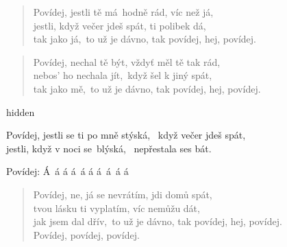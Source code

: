 \begin{song}{}
\begin{verse}
   Povídej, jestli tě má~hodně rád, víc než já, \\
   jestli, když večer jdeš spát, ti polibek dá, \\
   tak jako já,~to už je dávno, tak povídej, hej, povídej.
\end{verse}
\begin{verse}
   Povídej, nechal tě být, vždyť měl tě tak rád, \\
   nebos' ho nechala jít,~když šel k jiný spát, \\
   tak jako mě,~to už je dávno, tak povídej, hej, povídej.
\end{verse}
  \begin{optional}{hidden}
\inlinechord{}          
\end{optional}
\begin{refren}
   Povídej, jestli se ti po mně stýská, ~když večer jdeš spát, \\
   jestli, když v noci se~blýská, ~nepřestala ses bát.
\end{refren}
\begin{deco}
  Povídej: Á~á á á~á á á~á~á á  %
\end{deco}
\begin{verse}
   Povídej, ne, já se nevrátím, jdi domů spát, \\
   tvou lásku ti vyplatím, víc nemůžu dát, \\
   jak jsem dal dřív,~to už je dávno, tak povídej, hej, povídej. \\
   Povídej, povídej, povídej.
\end{verse}
\end{song}
\pagebreak
